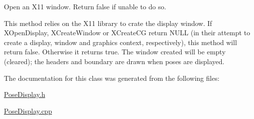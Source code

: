 Open an X11 window. Return false if unable to do so. 

This method relies on the X11 library to crate the display window. If X\+Open\+Display, X\+Create\+Window or X\+Create\+C\+G return N\+U\+L\+L (in their attempt to create a display, window and graphics context, respectively), this method will return false. Otherwise it returns true. The window created will be empty (cleared); the headers and boundary are drawn when poses are displayed. 

The documentation for this class was generated from the following files\+:\begin{DoxyCompactItemize}
\item 
\hyperlink{PoseDisplay_8h}{Pose\+Display.\+h}\item 
\hyperlink{PoseDisplay_8cpp}{Pose\+Display.\+cpp}\end{DoxyCompactItemize}
